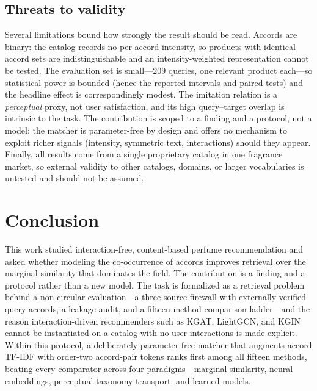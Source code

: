 \documentclass[conference]{IEEEtran}
\begin{document}
\subsection{Threats to validity}
Several limitations bound how strongly the result should be read. Accords are binary:
the catalog records no per-accord intensity, so products with identical accord sets are
indistinguishable and an intensity-weighted representation cannot be tested. The evaluation
set is small---$209$ queries, one relevant product each---so statistical power is bounded
(hence the reported intervals and paired tests) and the headline effect is correspondingly
modest. The imitation relation is a \emph{perceptual} proxy, not user satisfaction, and its
high query--target overlap is intrinsic to the task. The contribution is scoped to a finding
and a protocol, not a model: the matcher is parameter-free by design and offers no
mechanism to exploit richer signals (intensity, symmetric text, interactions) should they
appear. Finally, all results come from a single proprietary catalog in one fragrance
market, so external validity to other catalogs, domains, or larger vocabularies is untested
and should not be assumed.

\section{Conclusion}\label{sec:conclusion}
This work studied interaction-free, content-based perfume recommendation and asked whether
modeling the co-occurrence of accords improves retrieval over the marginal similarity that
dominates the field. The contribution is a finding and a protocol rather than a new model.
The task is formalized as a retrieval problem behind a non-circular evaluation---a
three-source firewall with externally verified query accords, a leakage audit, and a
fifteen-method comparison ladder---and the reason interaction-driven recommenders such as
KGAT, LightGCN, and KGIN cannot be instantiated on a catalog with no user interactions is
made explicit. Within this protocol, a deliberately parameter-free matcher that
augments accord TF-IDF with order-two accord-pair tokens ranks first among all fifteen
methods, beating every comparator across four paradigms---marginal similarity, neural
embeddings, perceptual-taxonomy transport, and learned models.
\end{document}
